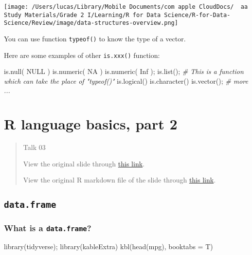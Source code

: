 \documentclass[
]{article}
\newenvironment{Shaded}{}{}
\newcommand{\AttributeTok}[1]{\textcolor[rgb]{0.49,0.56,0.16}{#1}}
\newcommand{\CommentTok}[1]{\textcolor[rgb]{0.38,0.63,0.69}{\textit{#1}}}
\newcommand{\ConstantTok}[1]{\textcolor[rgb]{0.53,0.00,0.00}{#1}}
\newcommand{\FunctionTok}[1]{\textcolor[rgb]{0.02,0.16,0.49}{#1}}
\newcommand{\NormalTok}[1]{#1}
\begin{document}
\texttt{[image: /Users/lucas/Library/Mobile Documents/com~apple~CloudDocs/~~aa Study Materials/Grade 2 I/Learning/R for Data Science/R-for-Data-Science/Review/image/data-structures-overview.png]}

You can use function \texttt{typeof()} to know the type of a vector.

Here are some examples of other \texttt{is.xxx()} function:

\begin{Shaded}
\begin{Highlighting}[]
\FunctionTok{is.null}\NormalTok{( }\ConstantTok{NULL}\NormalTok{ )}
\FunctionTok{is.numeric}\NormalTok{( }\ConstantTok{NA}\NormalTok{ )}
\FunctionTok{is.numeric}\NormalTok{( }\ConstantTok{Inf}\NormalTok{ );}
\FunctionTok{is.list}\NormalTok{(); }\CommentTok{\# This is a function which can take the place of "typeof()"}
\FunctionTok{is.logical}\NormalTok{()}
\FunctionTok{is.character}\NormalTok{()}
\FunctionTok{is.vector}\NormalTok{();}
\CommentTok{\# more ...}
\end{Highlighting}
\end{Shaded}

\hypertarget{r-language-basics-part-2}{%
\section{R language basics, part 2}\label{r-language-basics-part-2}}

\begin{quote}
Talk 03

View the original slide through \href{../talk03.pdf}{this link}.

View the original R markdown file of the slide through
\href{../talk03.Rmd}{this link}.
\end{quote}

\hypertarget{dataframe}{%
\subsection{\texorpdfstring{\texttt{data.frame}}{data.frame}}\label{dataframe}}

\hypertarget{what-is-a-dataframe}{%
\subsubsection{\texorpdfstring{\textbf{What is a
\texttt{data.frame}?}}{What is a data.frame?}}\label{what-is-a-dataframe}}

\begin{Shaded}
\begin{Highlighting}[]
\FunctionTok{library}\NormalTok{(tidyverse);}
\FunctionTok{library}\NormalTok{(kableExtra)}
\FunctionTok{kbl}\NormalTok{(}\FunctionTok{head}\NormalTok{(mpg), }
    \AttributeTok{booktabs =}\NormalTok{ T)}
\end{Highlighting}
\end{Shaded}
\end{document}
